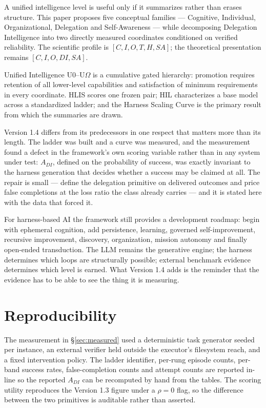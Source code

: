 \documentclass[11pt]{article}
\theoremstyle{definition}
\newcommand{\Om}{\ensuremath{\Omega}}
\begin{document}
A unified intelligence level is useful only if it summarizes rather than erases structure. This paper proposes five conceptual families --- Cognitive, Individual, Organizational, Delegation and Self-Awareness --- while decomposing Delegation Intelligence into two directly measured coordinates conditioned on verified reliability. The scientific profile is $[C, I, O, T, H, SA]$; the theoretical presentation remains $[C, I, O, DI, SA]$.

Unified Intelligence U0--U\Om{} is a cumulative gated hierarchy: promotion requires retention of all lower-level capabilities and satisfaction of minimum requirements in every coordinate. HLIS scores one frozen pair; HIL characterizes a base model across a standardized ladder; and the Harness Scaling Curve is the primary result from which the summaries are drawn.

Version 1.4 differs from its predecessors in one respect that matters more than its length. The ladder was built and a curve was measured, and the measurement found a defect in the framework's own scoring variable rather than in any system under test: $A_{DI}$, defined on the probability of success, was exactly invariant to the harness generation that decides whether a success may be claimed at all. The repair is small --- define the delegation primitive on delivered outcomes and price false completions at the loss ratio the class already carries --- and it is stated here with the data that forced it.

For harness-based AI the framework still provides a development roadmap: begin with ephemeral cognition, add persistence, learning, governed self-improvement, recursive improvement, discovery, organization, mission autonomy and finally open-ended transduction. The LLM remains the generative engine; the harness determines which loops are structurally possible; external benchmark evidence determines which level is earned. What Version 1.4 adds is the reminder that the evidence has to be able to see the thing it is measuring.

\section*{Reproducibility}

The measurement in \S\ref{sec:measured} used a deterministic task generator seeded per instance, an external verifier held outside the executor's filesystem reach, and a fixed intervention policy. The ladder identifier, per-rung episode counts, per-band success rates, false-completion counts and attempt counts are reported in-line so the reported $A_{DI}$ can be recomputed by hand from the tables. The scoring utility reproduces the Version 1.3 figure under a $\rho = 0$ flag, so the difference between the two primitives is auditable rather than asserted.
\end{document}
